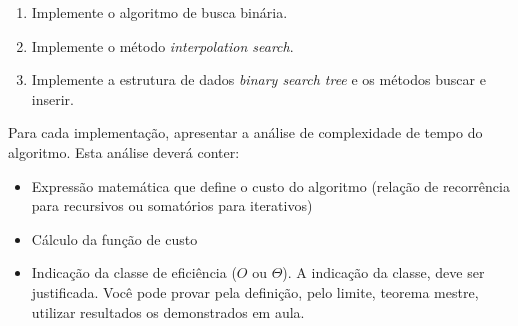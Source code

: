 \documentclass{article}
\begin{document}
\begin{enumerate}
    \item Implemente o algoritmo de busca binária.
    \item Implemente o método \textit{interpolation search}.
    \item Implemente a estrutura de dados \textit{binary search tree} e os métodos buscar e inserir.
\end{enumerate}

Para cada implementação, apresentar a análise de complexidade de tempo do algoritmo. Esta análise deverá conter:

\begin{itemize}
    \item Expressão matemática que define o custo do algoritmo (relação de recorrência para recursivos ou somatórios para iterativos) 
    \item Cálculo da função de custo
    \item Indicação da classe de eficiência ($O$ ou $\Theta$). A indicação da classe, deve ser justificada. Você pode provar pela definição, pelo limite, teorema mestre, utilizar resultados os demonstrados em aula.
\end{itemize}


%
%
\end{document}
